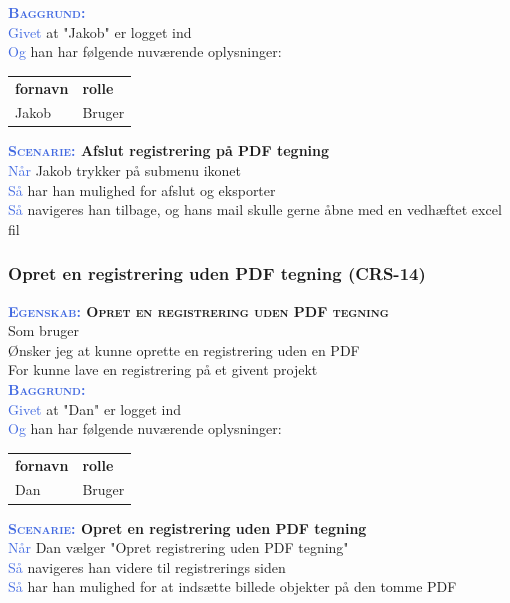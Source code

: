 \textsc{\textcolor{RoyalBlue}{\textbf{Baggrund:}}}\\
\textcolor{RoyalBlue}{Givet} at "Jakob" er logget ind\\
\textcolor{RoyalBlue}{Og} han har følgende nuværende oplysninger:\\
\begin{tabular}{| l | l |}
	\textbf{fornavn} & \textbf{rolle} \\
	Jakob & Bruger\\
\end{tabular}
\newline

\textbf{\textsc{\textcolor{RoyalBlue}{Scenarie:}} Afslut registrering på PDF tegning}\\
\textcolor{RoyalBlue}{Når} Jakob trykker på submenu ikonet\\
\textcolor{RoyalBlue}{Så}  har han mulighed for afslut og eksporter\\
\textcolor{RoyalBlue}{Så}  navigeres han tilbage, og hans mail skulle gerne åbne med en vedhæftet excel fil\\

\subsubsection{Opret en registrering uden PDF tegning (CRS-14)} \label{sec:USOpretRegUdenPDF}
\textbf{\textsc{\textcolor{RoyalBlue}{Egenskab:} Opret en registrering uden PDF tegning}}\\
Som bruger\\
Ønsker jeg at kunne oprette en registrering uden en PDF\\
For kunne lave en registrering på et givent projekt\\

\textsc{\textcolor{RoyalBlue}{\textbf{Baggrund:}}}\\
\textcolor{RoyalBlue}{Givet} at "Dan" er logget ind\\
\textcolor{RoyalBlue}{Og} han har følgende nuværende oplysninger:\\
\begin{tabular}{| l | l |}
	\textbf{fornavn} & \textbf{rolle} \\
	Dan & Bruger\\
\end{tabular}
\newline

\textbf{\textsc{\textcolor{RoyalBlue}{Scenarie:}} Opret en registrering uden PDF tegning}\\
\textcolor{RoyalBlue}{Når} Dan vælger "Opret registrering uden PDF tegning"\\
\textcolor{RoyalBlue}{Så} navigeres han videre til registrerings siden\\
\textcolor{RoyalBlue}{Så} har han mulighed for at indsætte billede objekter på den tomme PDF\\

